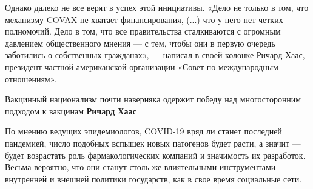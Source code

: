 Однако далеко не все верят в успех этой инициативы. «Дело не только в том, что
механизму COVAX не хватает финансирования, (...) что у него нет четких
полномочий. Дело в том, что все правительства сталкиваются с огромным давлением
общественного мнения --- с тем, чтобы они в первую очередь заботились о
собственных гражданах», --- написал в своей колонке Ричард Хаас, президент
частной американской организации «Совет по международным отношениям».

Вакцинный национализм почти наверняка одержит победу над многосторонним подходом к вакцинам
\textbf{Ричард Хаас}

По мнению ведущих эпидемиологов, COVID-19 вряд ли станет последней пандемией,
число подобных вспышек новых патогенов будет расти, а значит --- будет возрастать
роль фармакологических компаний и значимость их разработок. Весьма вероятно,
что они станут столь же влиятельными инструментами внутренней и внешней
политики государств, как в свое время социальные сети.

